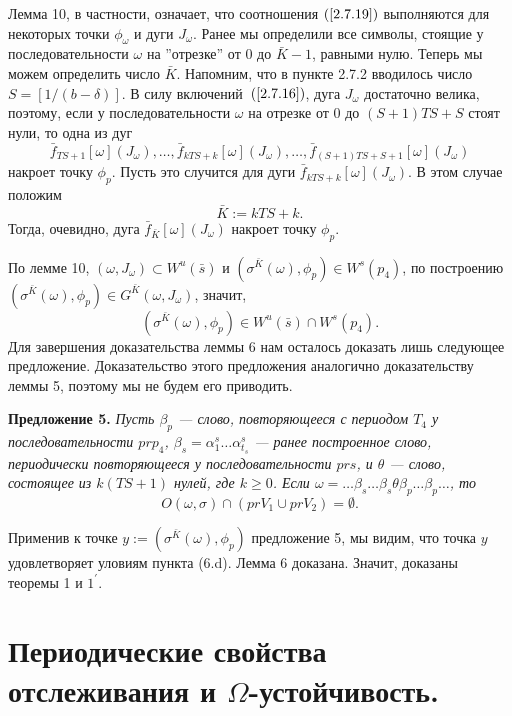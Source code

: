 \documentclass[12pt]{article}
\begin{document}
Лемма 10, в частности, означает, что соотношения $(\ref{2.7.19})$ выполняются для некоторых точки $\phi_\omega$ и дуги $J_{\omega}$.
Ранее мы определили все символы, стоящие у последовательности $\omega$ на ''отрезке'' от 0 до $\bar{K}-1$, равными нулю. Теперь мы можем определить число $\bar{K}$.
Напомним, что в пункте 2.7.2 вводилось число $S=[1/(b-\delta)]$.%
В силу включений~$(\ref{2.7.16})$, дуга $J_{\omega}$ достаточно велика, поэтому, если у последовательности $\omega$ на отрезке от 0 до $(S+1)TS+S$ стоят нули, то одна из дуг
$$\bar{f}_{TS+1}[\omega](J_{\omega}), \ldots, \bar{f}_{kTS+k}[\omega](J_{\omega}), \ldots, \bar{f}_{(S+1)TS+S+1}[\omega](J_{\omega})$$
накроет точку $\phi_p$. Пусть это случится для дуги $\bar{f}_{kTS+k}[\omega](J_{\omega})$. В этом случае положим 
$$\bar{K}:=kTS+k.$$
Тогда, очевидно, дуга $\bar{f}_{\bar{K}}[\omega](J_{\omega})$ накроет точку $\phi_p$.

По лемме 10, $(\omega,J_{\omega})\subset W^u(\bar{s})$ и $(\sigma^{\bar{K}}(\omega),\phi_p)\in W^s(p_4)$, по построению $(\sigma^{\bar{K}}(\omega),\phi_p)\in G^{\bar{K}}(\omega,J_{\omega})$, значит,
$$(\sigma^{\bar{K}}(\omega),\phi_p)\in W^u(\bar{s})\cap W^s(p_4).$$
Для завершения доказательства леммы 6 нам осталось доказать лишь следующее предложение. Доказательство этого предложения аналогично доказательству леммы 5, поэтому мы не будем его приводить.

\textbf{Предложение 5.}
\textit{
Пусть $\beta_p$ --- слово, повторяющееся с периодом $T_4$ у последовательности $pr p_4$, $\beta_s=\alpha^s_1\ldots\alpha^s_{t_s}$ --- ранее построенное слово, периодически повторяющееся у последовательности $pr s$, и $\theta$ --- слово, состоящее из $k(TS+1)$ нулей, где $k\geq 0$. Если $\omega=\ldots\beta_s\ldots\beta_s\theta\beta_p\ldots\beta_p\ldots$, то $$O(\omega,\sigma)\cap (pr V_1\cup pr V_2)=\emptyset.$$}
	
Применив к точке $y:=(\sigma^{\bar{K}}(\omega),\phi_p)$ предложение 5, мы видим, что точка $y$ удовлетворяет уловиям пункта (6.d). Лемма 6 доказана. Значит, доказаны теоремы 1 и $\mbox{1}^{\prime}$.

\section{Периодические свойства отслеживания и $\Omega$-устойчивость.}
\end{document}
